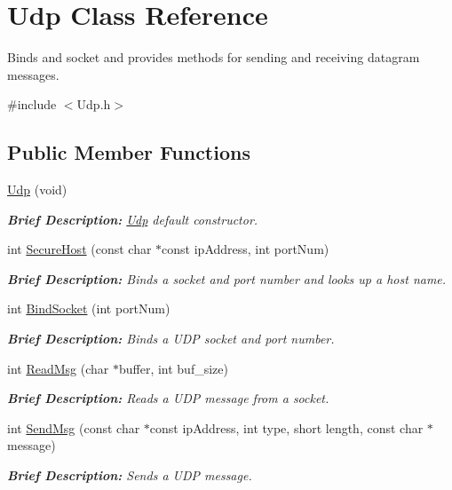 \hypertarget{class_udp}{\section{Udp Class Reference}
\label{class_udp}
}


Binds and socket and provides methods for sending and receiving datagram messages.  




{\ttfamily \#include $<$Udp.\-h$>$}

\subsection*{Public Member Functions}
\begin{DoxyCompactItemize}
\item 
\hyperlink{class_udp_af02656c58abb169fed14879aa301d8b5}{Udp} (void)
\begin{DoxyCompactList}\small\item\em {\bfseries Brief Description\-:} \hyperlink{class_udp}{Udp} default constructor. \end{DoxyCompactList}\item 
int \hyperlink{class_udp_a59d0fcaf80186548de9e01449dcdfc56}{Secure\-Host} (const char $\ast$const ip\-Address, int port\-Num)
\begin{DoxyCompactList}\small\item\em {\bfseries Brief Description\-:} Binds a socket and port number and looks up a host name. \end{DoxyCompactList}\item 
int \hyperlink{class_udp_aac5c5629d5372ec0b693b4b207c7f7cf}{Bind\-Socket} (int port\-Num)
\begin{DoxyCompactList}\small\item\em {\bfseries Brief Description\-:} Binds a U\-D\-P socket and port number. \end{DoxyCompactList}\item 
int \hyperlink{class_udp_a78da622d0b317ffe20ca1f20ea4f5311}{Read\-Msg} (char $\ast$buffer, int buf\-\_\-size)
\begin{DoxyCompactList}\small\item\em {\bfseries Brief Description\-:} Reads a U\-D\-P message from a socket. \end{DoxyCompactList}\item 
int \hyperlink{class_udp_a2fa8b855a78c2707a10f5fff95b4234f}{Send\-Msg} (const char $\ast$const ip\-Address, int type, short length, const char $\ast$message)
\begin{DoxyCompactList}\small\item\em {\bfseries Brief Description\-:} Sends a U\-D\-P message. \end{DoxyCompactList}\end{DoxyCompactItemize}


